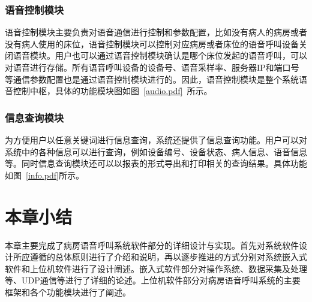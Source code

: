 \subsubsection{语音控制模块}
语音控制模块主要负责对语音通信进行控制和参数配置，比如没有病人的病房或者没有病人使用的床位，语音控制模块可以控制对应病房或者床位的语音呼叫设备关闭语音模块。用户也可以通过语音控制模块确认是哪个床位发起的语音呼叫，可以对语音进行存储。所有语音呼叫设备的设备号、语音采样率、服务器IP和端口号等通信参数配置也是通过语音控制模块进行的。因此，语音控制模块是整个系统语音控制中枢，具体的功能模块图如图~\ref{audio.pdf}~所示。

\subsubsection{信息查询模块}
为方便用户以任意关键词进行信息查询，系统还提供了信息查询功能。用户可以对系统中的各种信息可以进行查询，例如设备编号、设备状态、病人信息、语音信息等。同时信息查询模块还可以以报表的形式导出和打印相关的查询结果。具体功能如图~\ref{info.pdf}所示。

\section{本章小结}
本章主要完成了病房语音呼叫系统软件部分的详细设计与实现。首先对系统软件设计所应遵循的总体原则进行了介绍和说明，再以逐步推进的方式分别对系统嵌入式软件和上位机软件进行了设计阐述。嵌入式软件部分对操作系统、数据采集及处理等、UDP通信等进行了详细的论述。上位机软件部分对病房语音呼叫系统的主要框架和各个功能模块进行了阐述。
